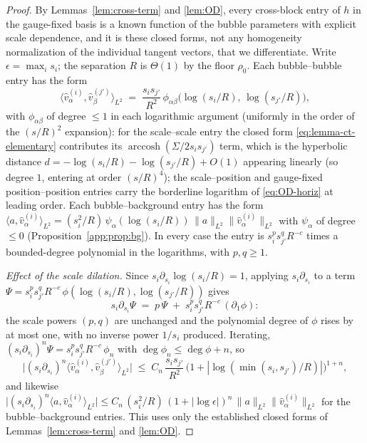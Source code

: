 \documentclass[11pt,letterpaper]{article}
\theoremstyle{definition}
\begin{document}
\begin{proof}
By Lemmas~\ref{lem:cross-term} and \ref{lem:OD}, every cross-block entry of $h$ in the gauge-fixed basis is a known function of the bubble parameters with explicit scale dependence, and it is these closed forms, not any homogeneity normalization of the individual tangent vectors, that we differentiate. Write $\epsilon = \max_i s_i$; the separation $R$ is $\Theta(1)$ by the floor $\rho_0$. Each bubble--bubble entry has the form
\[
\langle \hat v_\alpha^{(i)},\hat v_\beta^{(j')}\rangle_{L^2} \;=\; \frac{s_i s_{j'}}{R^2}\,\phi_{\alpha\beta}\bigl(\log(s_i/R),\,\log(s_{j'}/R)\bigr),
\]
with $\phi_{\alpha\beta}$ of degree $\le 1$ in each logarithmic argument (uniformly in the order of the $(s/R)^2$ expansion): for the scale--scale entry the closed form \eqref{eq:lemma-ct-elementary} contributes its $\operatorname{arccosh}(\Sigma/2 s_i s_{j'})$ term, which is the hyperbolic distance $d = -\log(s_i/R) - \log(s_{j'}/R) + O(1)$ appearing linearly (so degree $1$, entering at order $(s/R)^4$); the scale--position and gauge-fixed position--position entries carry the borderline logarithm of \eqref{eq:OD-horiz} at leading order. Each bubble--background entry has the form $\langle a,\hat v_\alpha^{(i)}\rangle_{L^2} = (s_i^2/R)\,\psi_\alpha(\log(s_i/R))\,\|a\|_{L^2}\|\hat v_\alpha^{(i)}\|_{L^2}$ with $\psi_\alpha$ of degree $\le 0$ (Proposition~\ref{app:prop:bg}). In every case the entry is $s_i^{p}s_{j'}^{q}R^{-c}$ times a bounded-degree polynomial in the logarithms, with $p, q\ge 1$.

\emph{Effect of the scale dilation.} Since $s_i\partial_{s_i}\log(s_i/R) = 1$, applying $s_i\partial_{s_i}$ to a term $\Psi = s_i^{p}s_{j'}^{q}R^{-c}\,\phi(\log(s_i/R),\log(s_{j'}/R))$ gives
\[
s_i\partial_{s_i}\Psi \;=\; p\,\Psi \;+\; s_i^{p}s_{j'}^{q}R^{-c}\,(\partial_1\phi):
\]
the scale powers $(p,q)$ are unchanged and the polynomial degree of $\phi$ rises by at most one, with no inverse power $1/s_i$ produced. Iterating, $(s_i\partial_{s_i})^n\Psi = s_i^{p}s_{j'}^{q}R^{-c}\,\phi_n$ with $\deg\phi_n\le\deg\phi + n$, so
\begin{equation}\label{eq:iterated-scale-derivative-cross}
\bigl|(s_i\partial_{s_i})^n \langle\hat v_\alpha^{(i)},\hat v_\beta^{(j')}\rangle_{L^2}\bigr| \;\le\; C_n\,\frac{s_i s_{j'}}{R^2}\,\bigl(1+|\log(\min(s_i,s_{j'})/R)|\bigr)^{1+n},
\end{equation}
and likewise $\bigl|(s_i\partial_{s_i})^n\langle a,\hat v_\alpha^{(i)}\rangle_{L^2}\bigr| \le C_n\,(s_i^2/R)\,(1+|\log\epsilon|)^{n}\,\|a\|_{L^2}\|\hat v_\alpha^{(i)}\|_{L^2}$ for the bubble--background entries. This uses only the established closed forms of Lemmas~\ref{lem:cross-term} and \ref{lem:OD}.


\end{proof}
\end{document}
